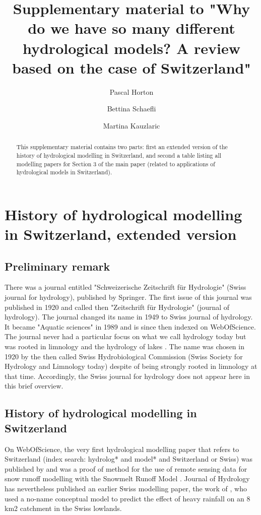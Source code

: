 \documentclass{article}
\title{Supplementary material to "Why do we have so many different hydrological models? A review based on the case of Switzerland"}
\author[1]{Pascal Horton}
\author[1]{Bettina Schaefli}
\author[1]{Martina Kauzlaric}
\affil[1]{Institute of Geography \& Oeschger Centre for Climate Change Research, University of Bern, Bern, Switzerland}
\date{}
\begin{document}
	
\maketitle

\begin{abstract}
	This supplementary material contains two parts: first an extended version of the history of hydrological modelling in Switzerland, and second a table listing all modelling papers for Section 3 of the main paper (related to applications of hydrological models in Switzerland).
\end{abstract}



\section{History of hydrological modelling in Switzerland, extended version}


\subsection{Preliminary remark}

There was a journal entitled "Schweizerische Zeitschrift für Hydrologie" (Swiss journal for hydrology), published by Springer. The first issue of this journal was published in 1920 and called then "Zeitschrift für Hydrologie" (journal of hydrology). The journal changed its name in 1949 to Swiss journal of hydrology. It became "Aquatic sciences" in 1989 \citep{bossard1989} and is since then indexed on WebOfScience. The journal never had a particular focus on what we call hydrology today but was rooted in limnology and the hydrology of lakes \citep{tockner2009}. The name was chosen in 1920 by the then called Swiss Hydrobiological Commission (Swiss Society for Hydrology and Limnology today) \citep{perret2001} despite of being strongly rooted in limnology at that time. Accordingly, the Swiss journal for hydrology does not appear here in this brief overview.


\subsection{History of hydrological modelling in Switzerland}

On WebOfScience, the very first hydrological modelling paper that refers to Switzerland (index search: hydrolog* and model* and Switzerland or Swiss) was published by \citet{baumgartner1986} and was a proof of method for the use of remote sensing data for snow runoff modelling with the Snowmelt Runoff Model \citep[SRM,][]{martinec1975}. Journal of Hydrology has nevertheless published an earlier Swiss modelling paper, the work of \citet{hager1984}, who used a no-name conceptual model to predict the effect of heavy rainfall on an 8 km2 catchment in the Swiss lowlands.
\end{document}
